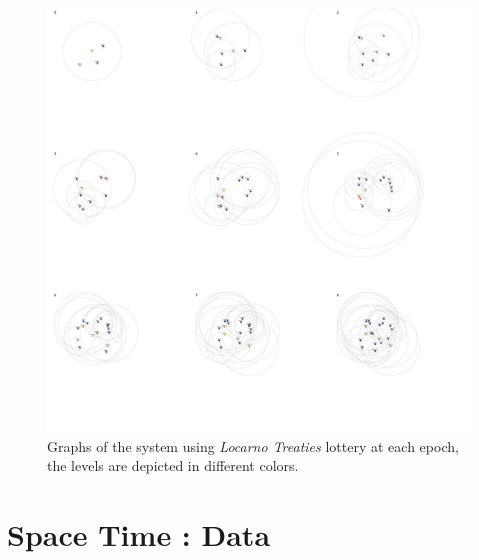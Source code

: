 \documentclass[a4paper,11pt,twoside=semi,openright]{report}
\begin{document}
\begin{figure}[!h] 
\centering
\includegraphics[width=500pt]{figures/LocarnoTreaties-LocarnoFinal}
\caption{Graphs of the system using \textit{Locarno Treaties} lottery at each
  epoch, the levels are depicted in different colors.}
  \label{fig:LocarnoTreaties-LocarnoFinal}
\end{figure}

\chapter{Space Time : Data} \label{app:SpaceTime-data}
\end{document}
